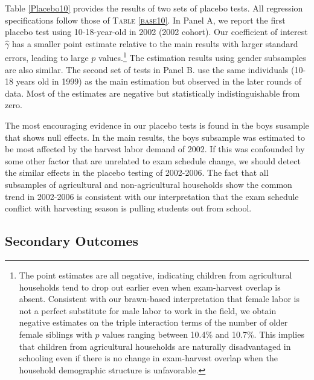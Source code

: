 \documentclass[12pt,letterpaper]{article}\usepackage[margin=1in]{geometry}
\newcommand{\0}{\ensuremath{\mbox{\boldmath $0$}}}
\begin{document}
Table \ref{Placebo10} provides the results of two sets of placebo tests. All regression specifications follow those of \textsc{Table \ref{base10}}. In Panel A, we report the first placebo test using 10-18-year-old in 2002 (2002 cohort). Our coefficient of interest $\hat{\gamma}$ has a smaller point estimate relative to the main results with larger standard errors, leading to large $p$ values.\footnote{The point estimates are all negative, indicating children from agricultural households tend to drop out earlier even when exam-harvest overlap is absent. Consistent with our brawn-based interpretation that female labor is not a perfect substitute for male labor to work in the field, we obtain negative estimates on the triple interaction terms of the number of older female siblings with $p$ values ranging between 10.4\% and 10.7\%. This implies that children from agricultural households are naturally disadvantaged in schooling even if there is no change in exam-harvest overlap when the household demographic structure is unfavorable. } The estimation results using gender subsamples are also similar. The second set of tests in Panel B. use the same individuals (10-18 years old in 1999) as the main estimation but observed in the later rounds of data. Most of the estimates are negative but statistically indistinguishable from zero. 

The most encouraging evidence in our placebo tests is found in the boys susample that shows null effects. In the main results, the boys subsample was estimated to be most affected by the harvest labor demand of 2002. If this was confounded by some other factor that are unrelated to exam schedule change, we should detect the similar effects in the placebo testing of 2002-2006. The fact that all subsamples of agricultural and non-agricultural households show the common trend in 2002-2006 is consistent with our interpretation that the exam schedule conflict with harvesting season is pulling students out from school. 


\subsection{Secondary Outcomes}
\end{document}
